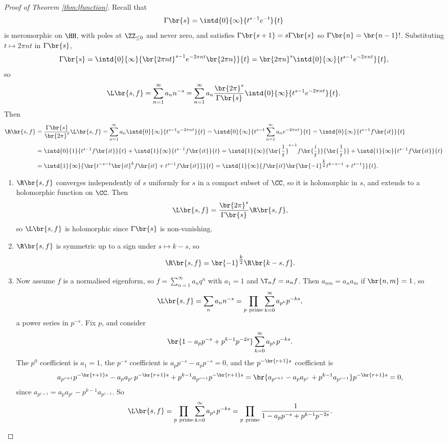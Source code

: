 \begin{proof}[Proof of Theorem \ref{thm:lfunction}]
Recall that
$$ \Gamma\br{s} = \intd{0}{\infty}{t^{s - 1}e^{-t}}{t} $$
is meromorphic on $ \HH $, with poles at $ \ZZ_{\le 0} $ and never zero, and satisfies $ \Gamma\br{s + 1} = s\Gamma\br{s} $ so $ \Gamma\br{n} = \br{n - 1}! $. Substituting $ t \mapsto 2\pi nt $ in $ \Gamma\br{s} $,
$$ \Gamma\br{s} = \intd{0}{\infty}{\br{2\pi nt}^{s - 1}e^{-2\pi nt}\br{2\pi n}}{t} = \br{2\pi n}^s\intd{0}{\infty}{t^{s - 1}e^{-2\pi nt}}{t}, $$
so
$$ \L\br{s, f} = \sum_{n = 1}^\infty a_nn^{-s} = \sum_{n = 1}^\infty a_n\dfrac{\br{2\pi}^s}{\Gamma\br{s}}\intd{0}{\infty}{t^{s - 1}e^{-2\pi nt}}{t}. $$
Then
\begin{align*}
\R\br{s, f}
& = \dfrac{\Gamma\br{s}}{\br{2\pi}^s}\L\br{s, f}
= \sum_{n = 1}^\infty a_n\intd{0}{\infty}{t^{s - 1}e^{-2\pi nt}}{t}
= \intd{0}{\infty}{t^{s - 1}\sum_{n = 1}^\infty a_ne^{-2\pi nt}}{t}
= \intd{0}{\infty}{t^{s - 1}f\br{it}}{t} \\
& = \intd{0}{1}{t^{s - 1}f\br{it}}{t} + \intd{1}{\infty}{t^{s - 1}f\br{it}}{t}
= \intd{1}{\infty}{\br{\dfrac{1}{t}}^{s - 1}f\br{\dfrac{i}{t}}}{\br{\dfrac{1}{t}}} + \intd{1}{\infty}{t^{s - 1}f\br{it}}{t} \\
& = \intd{1}{\infty}{\br{t^{-s - 1}\br{it}^kf\br{it} + t^{s - 1}f\br{it}}}{t}
= \intd{1}{\infty}{f\br{it}\br{\br{-1}^{\tfrac{k}{2}}t^{k - s - 1} + t^{s - 1}}}{t}.
\end{align*}
\begin{enumerate}
\item $ \R\br{s, f} $ converges independently of $ s $ uniformly for $ s $ in a compact subset of $ \CC $, so it is holomorphic in $ s $, and extends to a holomorphic function on $ \CC $. Then
$$ \L\br{s, f} = \dfrac{\br{2\pi}^s}{\Gamma\br{s}}\R\br{s, f}, $$
so $ \L\br{s, f} $ is holomorphic since $ \Gamma\br{s} $ is non-vanishing.
\item $ \R\br{s, f} $ is symmetric up to a sign under $ s \mapsto k - s $, so
$$ \R\br{s, f} = \br{-1}^{\tfrac{k}{2}}\R\br{k - s, f}. $$
\item Now assume $ f $ is a normalised eigenform, so $ f = \sum_{n = 1}^\infty a_nq^n $ with $ a_1 = 1 $ and $ \T_nf = a_nf $. Then $ a_{nm} = a_na_m $ if $ \br{n, m} = 1 $, so
$$ \L\br{s, f} = \sum_n a_nn^{-s} = \prod_{p \ \text{prime}} \sum_{k = 0}^\infty a_{p^k}p^{-ks}, $$
a power series in $ p^{-s} $. Fix $ p $, and consider
$$ \br{1 - a_pp^{-s} + p^{k - 1}p^{-2s}}\sum_{k = 0}^\infty a_{p^k}p^{-ks}. $$
The $ p^0 $ coefficient is $ a_1 = 1 $, the $ p^{-s} $ coefficient is $ a_pp^{-s} - a_pp^{-s} = 0 $, and the $ p^{-\br{r + 1}s} $ coefficient is
$$ a_{p^{r + 1}}p^{-\br{r + 1}s} - a_pa_{p^r}p^{-\br{r + 1}s} + p^{k - 1}a_{p^{r - 1}}p^{-\br{r + 1}s} = \br{a_{p^{r + 1}} - a_pa_{p^r} + p^{k - 1}a_{p^{r - 1}}}p^{-\br{r + 1}s} = 0, $$
since $ a_{p^{r + 1}} = a_pa_{p^r} - p^{k - 1}a_{p^{r - 1}} $. So
$$ \L\br{s, f} = \prod_{p \ \text{prime}} \sum_{k = 0}^\infty a_{p^k}p^{-ks} = \prod_{p \ \text{prime}} \dfrac{1}{1 - a_pp^{-s} + p^{k - 1}p^{-2s}}. $$
\end{enumerate}
\end{proof}

